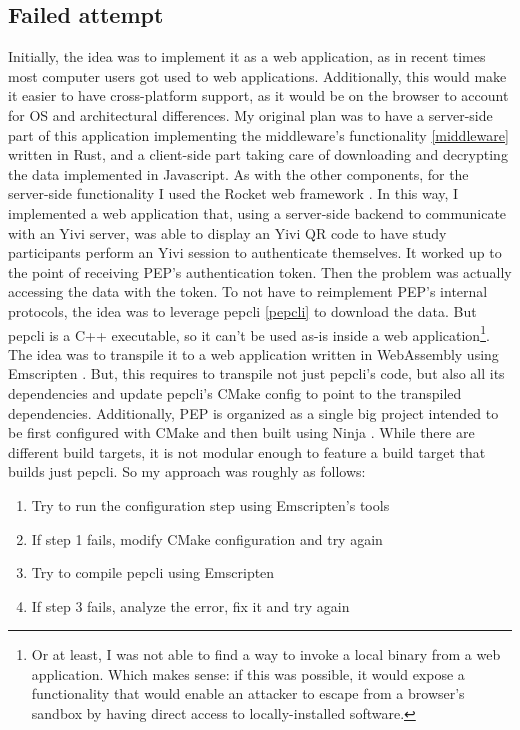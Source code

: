 \documentclass{report}
\begin{document}
\subsection{Failed attempt}
Initially, the idea was to implement it as a web application, as in recent times most computer users got used to web applications. Additionally, this would make it easier to have
cross-platform support, as it would be on the browser to account for OS and architectural differences. My original plan was to have a server-side part of this application
implementing the middleware's functionality \ref{middleware} written in Rust, and a client-side part taking care of downloading and decrypting the data implemented in Javascript.
As with the other components, for the server-side functionality I used the Rocket web framework \cite{rocket}.
In this way, I implemented a web application that, using a server-side backend to communicate with an Yivi server, was able to display an Yivi QR code to have study participants
perform an Yivi session to authenticate themselves. It worked up to the point of receiving PEP's authentication token. Then the problem was actually accessing the data with the
token. To not have to reimplement PEP's internal protocols, the idea was to leverage pepcli \ref{pepcli} to download the data. But pepcli is a C++ executable, so it can't be used
as-is inside a web application\footnote{Or at least, I was not able to find a way to invoke a local binary from a web application. Which makes sense: if this was possible, it would
expose a functionality that would enable an attacker to escape from a browser's sandbox by having direct access to locally-installed software.}. The idea was to transpile it to a web 
application written in WebAssembly using Emscripten \cite{emscripten}. But, this requires to transpile not
just pepcli's code, but also all its dependencies and update pepcli's CMake config to point to the transpiled dependencies. Additionally, PEP is organized as a single big project
intended to be first configured with CMake and then built using Ninja \cite{ninja}. While there are different build targets, it is not modular enough
to feature a build target that builds just pepcli. So my approach was roughly as follows:

\begin{enumerate}
		\item Try to run the configuration step using Emscripten's tools
		\item If step 1 fails, modify CMake configuration and try again
		\item Try to compile pepcli using Emscripten
		\item If step 3 fails, analyze the error, fix it and try again 
\end{enumerate}
\end{document}
